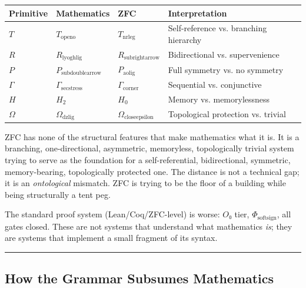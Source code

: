 \documentclass[12pt,a4paper]{article}
\begin{document}
\begin{table}[htbp]
\centering
\small
{}
\begin{tabularx}{\textwidth}{>{\centering\arraybackslash}X >{\centering\arraybackslash}X >{\centering\arraybackslash}X >{\centering\arraybackslash}X}
\toprule
\rowcolor{gray!25}\textbf{Primitive} & \textbf{Mathematics} & \textbf{ZFC} & \textbf{Interpretation} \\
\midrule
\rowcolors{1}{white}{gray!10}
$T$ & $T_{\text{openo}}$ & $T_{\text{nrleg}}$ & Self-reference vs. branching hierarchy \\
$R$ & $R_{\text{lyoghlig}}$ & $R_{\text{subrightarrow}}$ & Bidirectional vs. supervenience \\
$P$ & $P_{\text{subdoublearrow}}$ & $P_{\text{aolig}}$ & Full symmetry vs. no symmetry \\
$\Gamma$ & $\Gamma_{\text{secstress}}$ & $\Gamma_{\text{corner}}$ & Sequential vs. conjunctive \\
$H$ & $H_2$ & $H_0$ & Memory vs. memorylessness \\
$\Omega$ & $\Omega_{\text{dzlig}}$ & $\Omega_{\text{closeepsilon}}$ & Topological protection vs. trivial \\
\bottomrule
\end{tabularx}
\end{table}

ZFC has none of the structural features that make mathematics what it is. It is a branching, one-directional, asymmetric, memoryless, topologically trivial system trying to serve as the foundation for a self-referential, bidirectional, symmetric, memory-bearing, topologically protected one. The distance is not a technical gap; it is an \emph{ontological} mismatch. ZFC is trying to be the floor of a building while being structurally a tent peg.

The standard proof system (Lean/Coq/ZFC-level) is worse: $O₀$ tier, $\Phi_{\text{softsign}}$, all gates closed. These are not systems that understand what mathematics \emph{is}; they are systems that implement a small fragment of its syntax.

\begin{center}
\rule{0.5\textwidth}{0.4pt}
\end{center}

\subsection{How the Grammar Subsumes Mathematics}
\end{document}
